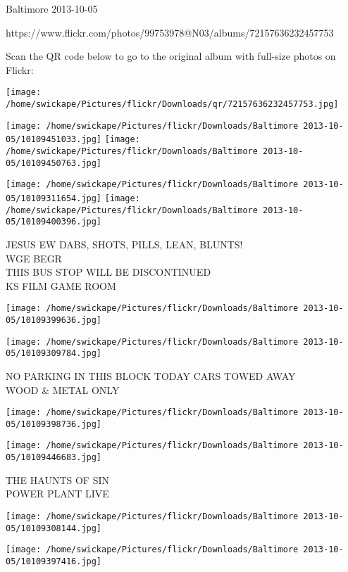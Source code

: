 \documentclass[10pt,letterpaper]{article}
\begin{document}
Baltimore 2013-10-05

https://www.flickr.com/photos/99753978@N03/albums/72157636232457753

Scan the QR code below to go to the original album with full-size photos on Flickr:

\texttt{[image: /home/swickape/Pictures/flickr/Downloads/qr/72157636232457753.jpg]}
\pagebreak

\texttt{[image: /home/swickape/Pictures/flickr/Downloads/Baltimore 2013-10-05/10109451033.jpg]}
\texttt{[image: /home/swickape/Pictures/flickr/Downloads/Baltimore 2013-10-05/10109450763.jpg]}

\texttt{[image: /home/swickape/Pictures/flickr/Downloads/Baltimore 2013-10-05/10109311654.jpg]}
\texttt{[image: /home/swickape/Pictures/flickr/Downloads/Baltimore 2013-10-05/10109400396.jpg]}

JESUS EW DABS, SHOTS, PILLS, LEAN, BLUNTS!\\
WGE BEGR\\
THIS BUS STOP WILL BE DISCONTINUED\\
KS FILM GAME ROOM
\pagebreak

\texttt{[image: /home/swickape/Pictures/flickr/Downloads/Baltimore 2013-10-05/10109399636.jpg]}

\vspace{0.25in}
\texttt{[image: /home/swickape/Pictures/flickr/Downloads/Baltimore 2013-10-05/10109309784.jpg]}

NO PARKING IN THIS BLOCK TODAY CARS TOWED AWAY\\
WOOD \& METAL ONLY
\pagebreak

\texttt{[image: /home/swickape/Pictures/flickr/Downloads/Baltimore 2013-10-05/10109398736.jpg]}

\vspace{0.25in}
\texttt{[image: /home/swickape/Pictures/flickr/Downloads/Baltimore 2013-10-05/10109446683.jpg]}

THE HAUNTS OF SIN\\
POWER PLANT LIVE
\pagebreak

\texttt{[image: /home/swickape/Pictures/flickr/Downloads/Baltimore 2013-10-05/10109308144.jpg]}

\vspace{0.25in}
\texttt{[image: /home/swickape/Pictures/flickr/Downloads/Baltimore 2013-10-05/10109397416.jpg]}
\end{document}
